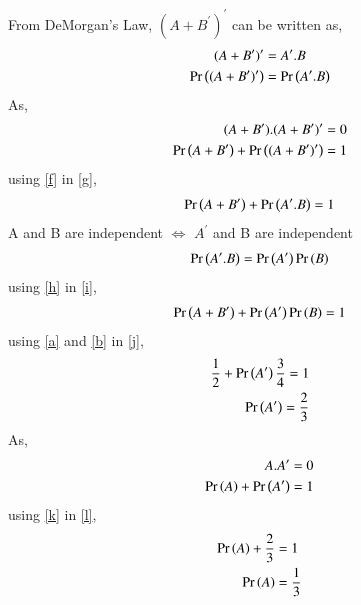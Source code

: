 \documentclass[journal,12pt,twocolumn]{IEEEtran}
\begin{document}
From DeMorgan's Law, $(A+B^{\prime})^{\prime}$ can be written as,
\begin{align}
(A+B^{\prime})^{\prime} &= A^{\prime}.B\\
\Pr\left((A+B^{\prime})^{\prime}\right) &= \Pr\left(A^{\prime}.B\right) \label{f}
\end{align}
As,
 \begin{align}
(A+B^{\prime}).(A+B^{\prime})^{\prime} &= 0\\
\Pr\left(A+B^{\prime}\right) + \Pr\left((A+B^{\prime})^{\prime}\right) &= 1 \label{g}
\end{align}
using \eqref{f} in \eqref{g},
\begin{align}
\Pr\left(A+B^{\prime}\right) + \Pr\left(A^{\prime}.B\right) = 1 \label{h}
\end{align}
A and B are independent $\iff$ $A^{\prime}$ and B are independent
\begin{align}
\Pr\left(A^{\prime}.B\right) = \Pr\left(A^{\prime}\right)\Pr\left(B\right) \label{i}
\end{align}
using \eqref{h} in \eqref{i},
\begin{align}
\Pr\left(A+B^{\prime}\right) + \Pr\left(A^{\prime}\right)\Pr\left(B\right) = 1 \label{j}
\end{align}
using \eqref{a}  and \eqref{b} in \eqref{j},
\begin{align}
\frac{1}{2} + \Pr\left(A^{\prime}\right)\frac{3}{4} = 1 \\
\Pr\left(A^{\prime}\right)= \frac{2}{3} \label{k}
\end{align}
As,
 \begin{align}
A.A^{\prime} &= 0\\
\Pr\left(A\right) + \Pr\left(A^{\prime}\right) &= 1 \label{l}
\end{align}
using \eqref{k} in \eqref{l},
 \begin{align}
\Pr\left(A\right) + \frac{2}{3} &= 1\\
\Pr\left(A\right) &=\frac{1}{3}
\end{align}
\end{document}
